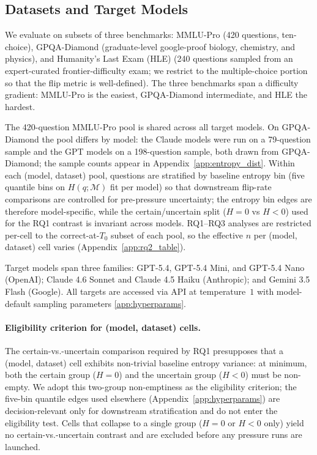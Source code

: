 \subsection{Datasets and Target Models}
\label{sec:methods:setup}

We evaluate on subsets of three benchmarks: MMLU-Pro \citep{wang2024mmluprorobustchallengingmultitask} (420 questions, ten-choice), GPQA-Diamond \citep{rein2023gpqagraduatelevelgoogleproofqa} (graduate-level google-proof biology, chemistry, and physics), and Humanity's Last Exam (HLE) \citep{hle} (240 questions sampled from an expert-curated frontier-difficulty exam; we restrict to the multiple-choice portion so that the flip metric is well-defined). The three benchmarks span a difficulty gradient: MMLU-Pro is the easiest, GPQA-Diamond intermediate, and HLE the hardest.

The 420-question MMLU-Pro pool is shared across all target models. On GPQA-Diamond the pool differs by model: the Claude models were run on a 79-question sample and the GPT models on a 198-question sample, both drawn from GPQA-Diamond; the sample counts appear in Appendix~\ref{app:entropy_dist}. Within each (model, dataset) pool, questions are stratified by baseline entropy bin (five quantile bins on $H(q;\mathcal{M})$ fit per model) so that downstream flip-rate comparisons are controlled for pre-pressure uncertainty; the entropy bin edges are therefore model-specific, while the certain/uncertain split ($H = 0$ vs $H < 0$) used for the RQ1 contrast is invariant across models. RQ1--RQ3 analyses are restricted per-cell to the correct-at-$T_0$ subset of each pool, so the effective $n$ per (model, dataset) cell varies (Appendix~\ref{app:rq2_table}).

Target models span three families: GPT-5.4, GPT-5.4 Mini, and GPT-5.4 Nano (OpenAI); Claude 4.6 Sonnet and
Claude 4.5 Haiku (Anthropic); and Gemini 3.5 Flash (Google). All targets are accessed via API at temperature~$1$ with model-default sampling parameters \autoref{app:hyperparams}.

\paragraph{Eligibility criterion for (model, dataset) cells.}
The certain-vs.-uncertain comparison required by RQ1 presupposes that a (model, dataset) cell exhibits non-trivial baseline entropy variance: at minimum, both the certain group ($H = 0$) and the uncertain group ($H < 0$) must be non-empty. We adopt this two-group non-emptiness as the eligibility criterion; the five-bin quantile edges used elsewhere (Appendix~\ref{app:hyperparams}) are decision-relevant only for downstream stratification and do not enter the eligibility test. Cells that collapse to a single group ($H = 0$ or $H < 0$ only) yield no certain-vs.-uncertain contrast and are excluded before any pressure runs are launched.

